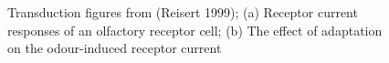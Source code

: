 \documentclass[
]{article}
\begin{document}
\begin{figure}

{\centering {}

}

\caption{Transduction figures from (Reisert 1999); (a) Receptor current responses of an olfactory receptor cell; (b) The effect of adaptation on the odour-induced receptor current}\label{fig:r99f24}
\end{figure}
\end{document}
